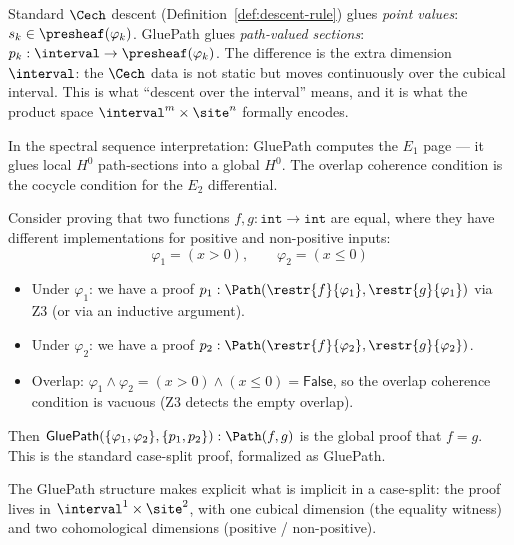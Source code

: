 \begin{remark}
Standard $\Cech$ descent (Definition~\ref{def:descent-rule}) glues
\emph{point values}: $s_k \in \presheaf(\varphi_k)$.  GluePath glues
\emph{path-valued sections}: $p_k : \interval \to \presheaf(\varphi_k)$.
The difference is the extra dimension $\interval$: the $\Cech$ data is not
static but moves continuously over the cubical interval.  This is what
``descent over the interval'' means, and it is what the product space
$\interval^m \times \site^n$ formally encodes.

In the spectral sequence interpretation: GluePath computes the $E_1$ page
--- it glues local $H^0$ path-sections into a global $H^0$.  The overlap
coherence condition is the cocycle condition for the $E_2$ differential.
\end{remark}

\begin{example}
Consider proving that two functions $f, g : \mathtt{int} \to \mathtt{int}$
are equal, where they have different implementations for positive and
non-positive inputs:
\[
  \varphi_1 = (x > 0), \qquad \varphi_2 = (x \leq 0)
\]
\begin{itemize}
\item Under $\varphi_1$: we have a proof $p_1 : \Path(\restr{f}{\varphi_1},
  \restr{g}{\varphi_1})$ via Z3 (or via an inductive argument).
\item Under $\varphi_2$: we have a proof $p_2 : \Path(\restr{f}{\varphi_2},
  \restr{g}{\varphi_2})$.
\item Overlap: $\varphi_1 \wedge \varphi_2 = (x > 0) \wedge (x \leq 0)
  = \mathsf{False}$, so the overlap coherence condition is vacuous (Z3
  detects the empty overlap).
\end{itemize}
Then $\mathsf{GluePath}(\{\varphi_1, \varphi_2\}, \{p_1, p_2\})
: \Path(f, g)$ is the global proof that $f = g$.  This is the standard
case-split proof, formalized as GluePath.

The GluePath structure makes explicit what is implicit in a case-split:
the proof lives in $\interval^1 \times \site^2$, with one cubical dimension
(the equality witness) and two cohomological dimensions (positive / non-positive).
\end{example}

